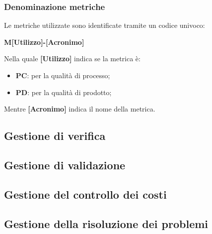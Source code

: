 \subsubsection{Denominazione metriche}
Le metriche utilizzate sono identificate tramite un codice univoco:
\begin{center}
    \textbf{M[Utilizzo]-[Acronimo]}
\end{center}
Nella quale \textbf{[Utilizzo]} indica se la metrica è:
\begin{itemize}
    \item \textbf{PC}: per la qualità di processo;
    \item \textbf{PD}:  per la qualità di prodotto;
\end{itemize}
Mentre \textbf{[Acronimo]} indica il nome della metrica.
\subsection{Gestione di verifica}
\subsection{Gestione di validazione}
\subsection{Gestione del controllo dei costi}
\subsection{Gestione della risoluzione dei problemi}

